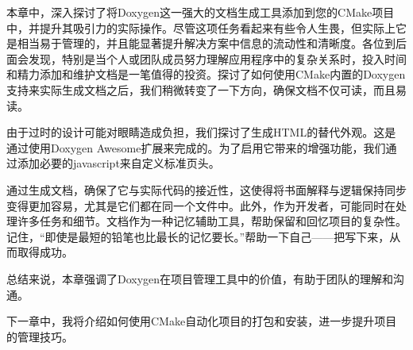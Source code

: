 本章中，深入探讨了将Doxygen这一强大的文档生成工具添加到您的CMake项目中，并提升其吸引力的实际操作。尽管这项任务看起来有些令人生畏，但实际上它是相当易于管理的，并且能显著提升解决方案中信息的流动性和清晰度。各位到后面会发现，特别是当个人或团队成员努力理解应用程序中的复杂关系时，投入时间和精力添加和维护文档是一笔值得的投资。探讨了如何使用CMake内置的Doxygen支持来实际生成文档之后，我们稍微转变了一下方向，确保文档不仅可读，而且易读。

由于过时的设计可能对眼睛造成负担，我们探讨了生成HTML的替代外观。这是通过使用Doxygen Awesome扩展来完成的。为了启用它带来的增强功能，我们通过添加必要的javascript来自定义标准页头。

通过生成文档，确保了它与实际代码的接近性，这使得将书面解释与逻辑保持同步变得更加容易，尤其是它们都在同一个文件中。此外，作为开发者，可能同时在处理许多任务和细节。文档作为一种记忆辅助工具，帮助保留和回忆项目的复杂性。记住，“即使是最短的铅笔也比最长的记忆要长。”帮助一下自己——把写下来，从而取得成功。

总结来说，本章强调了Doxygen在项目管理工具中的价值，有助于团队的理解和沟通。

下一章中，我将介绍如何使用CMake自动化项目的打包和安装，进一步提升项目的管理技巧。